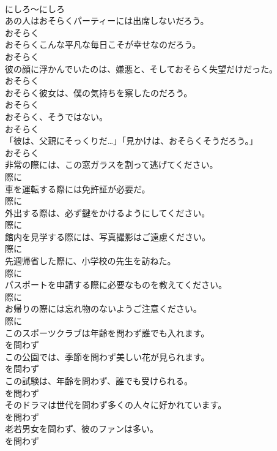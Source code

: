 \documentclass[8pt]{extreport}
\begin{document}
\begin{CJK}{UTF8}{min}
\\	にしろ～にしろ
\\	あの人はおそらくパーティーには出席しないだろう。	
\\	おそらく
\\	おそらくこんな平凡な毎日こそが幸せなのだろう。	
\\	おそらく
\\	彼の顔に浮かんでいたのは、嫌悪と、そしておそらく失望だけだった。	
\\	おそらく
\\	おそらく彼女は、僕の気持ちを察したのだろう。	
\\	おそらく
\\	おそらく、そうではない。	
\\	おそらく
\\	「彼は、父親にそっくりだ…」「見かけは、おそらくそうだろう。」	
\\	おそらく
\\	非常の際には、この窓ガラスを割って逃げてください。	
\\	際に
\\	車を運転する際には免許証が必要だ。	
\\	際に
\\	外出する際は、必ず鍵をかけるようにしてください。	
\\	際に
\\	館内を見学する際には、写真撮影はご遠慮ください。	
\\	際に
\\	先週帰省した際に、小学校の先生を訪ねた。	
\\	際に
\\	パスポートを申請する際に必要なものを教えてください。	
\\	際に
\\	お帰りの際には忘れ物のないようご注意ください。	
\\	際に
\\	このスポーツクラブは年齢を問わず誰でも入れます。	
\\	を問わず
\\	この公園では、季節を問わず美しい花が見られます。	
\\	を問わず
\\	この試験は、年齢を問わず、誰でも受けられる。	
\\	を問わず
\\	そのドラマは世代を問わず多くの人々に好かれています。	
\\	を問わず
\\	老若男女を問わず、彼のファンは多い。	
\\	を問わず

\end{CJK}
\end{document}
